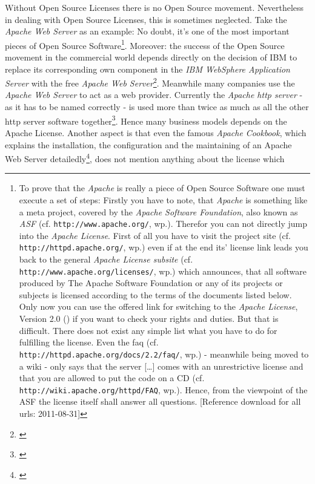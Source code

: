 %
Without Open Source Licenses there is no Open Source movement. Nevertheless in
dealing with Open Source Licenses, this is sometimes neglected. Take the
\emph{Apache Web Server} as an example: No doubt, it's one of the most important
pieces of Open Source Software\footnote{To prove that the \textit{Apache} is
really a piece of Open Source Software one must execute a set of steps: Firstly
you have to note, that \emph{Apache} is something like a meta project, covered
by the \emph{Apache Software Foundation}, also known as \emph{ASF} (cf.
\texttt{http://www.apache.org/}, wp.). Therefor you can not directly jump into the
\emph{Apache License}. First of all you have to visit the project site (cf.
\texttt{http://httpd.apache.org/}, wp.) even if at the end its' license link
leads you back to the general \emph{Apache License subsite} (cf.
\texttt{http://www.apache.org/licenses/}, wp.) which announces, that \glqq{}all
software produced by The Apache Software Foundation or any of its projects or
subjects is licensed according to the terms of the documents listed
below\grqq{}. Only now you can use the offered link for switching to the
\emph{Apache License}, Version 2.0 (\cite[cf.][\nopage
wp.]{AsfApacheLicense20a}) if you want to check your rights and duties. But that
is difficult. There does not exist any simple list what you have to do for
fulfilling the license. Even the faq (cf.
\texttt{http://httpd.apache.org/docs/2.2/faq/}, wp.) - meanwhile being moved to
a wiki - only says that the server \glqq{}[\ldots] comes with an unrestrictive
license\grqq{} and that you are allowed to put the code on a CD (cf.
\texttt{http://wiki.apache.org/httpd/FAQ}, wp.). Hence, from the viewpoint of
the ASF the license itself shall answer all questions. [Reference download for
all urls: 2011-08-31] }. Moreover: the success of the Open Source movement in
the commercial world depends directly on the decision of IBM to replace its
corresponding own component in the \textit{IBM WebSphere Application Server}
with the free \textit{Apache Web
Server}\footnote{\cite[cf.][287ff]{Moody2001a}}. Meanwhile many companies use
the \textit{Apache Web Server} to act as a web provider. Currently the
\emph{Apache http server} - as it has to be named correctly - is used more than
twice as much as all the other http server software
together\footnote{\cite[cf.][\nopage wp]{Netcraft2011a}}. Hence many business
models depends on the Apache License. Another aspect is that even the famous
\emph{Apache Cookbook}, which explains the installation, the configuration and
the maintaining of an Apache Web Server detailedly\footnote{\cite[cf.][\nopage
et passim]{CoaBow2004a}}, does not mention anything about the license which
